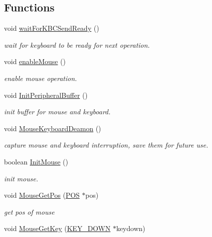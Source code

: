 \subsection*{Functions}
\begin{DoxyCompactItemize}
\item 
void \hyperlink{group__keyboard__mousse_ga34abdc78c759d98043173a4a6201ca84}{wait\+For\+K\+B\+C\+Send\+Ready} ()
\begin{DoxyCompactList}\small\item\em wait for keyboard to be ready for next operation. \end{DoxyCompactList}\item 
void \hyperlink{group__keyboard__mousse_gabe9197e112b3da28ce58f843b708112d}{enable\+Mouse} ()
\begin{DoxyCompactList}\small\item\em enable mouse operation. \end{DoxyCompactList}\item 
void \hyperlink{group__keyboard__mousse_gaf4634cae9b64dd421162159e34e8725a}{Init\+Peripheral\+Buffer} ()
\begin{DoxyCompactList}\small\item\em init buffer for mouse and keyboard. \end{DoxyCompactList}\item 
void \hyperlink{group__keyboard__mousse_ga5696e341ca1eb3c499d74e9e95c70638}{Mouse\+Keyboard\+Deamon} ()
\begin{DoxyCompactList}\small\item\em capture mouse and keyboard interruption, save them for future use. \end{DoxyCompactList}\item 
boolean \hyperlink{group__keyboard__mousse_ga918caebba49a6cb1b6911106662e1c35}{Init\+Mouse} ()
\begin{DoxyCompactList}\small\item\em init mouse. \end{DoxyCompactList}\item 
void \hyperlink{group__keyboard__mousse_ga1a120f7ff0f74ebdc1f34384d70b20e4}{Mouse\+Get\+Pos} (\hyperlink{struct_p_o_s}{P\+O\+S} $\ast$pos)
\begin{DoxyCompactList}\small\item\em get pos of mouse \end{DoxyCompactList}\item 
void \hyperlink{group__keyboard__mousse_ga01ccca89f78ef807bb021f66fe1addaf}{Mouse\+Get\+Key} (\hyperlink{struct_k_e_y___d_o_w_n}{K\+E\+Y\+\_\+\+D\+O\+W\+N} $\ast$keydown)

\end{DoxyCompactItemize}
